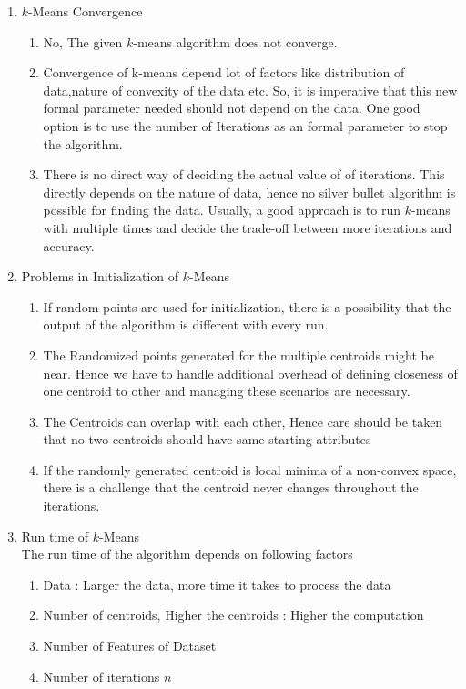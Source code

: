 \documentclass{article}
\begin{document}
\begin{enumerate}
\item $k$-Means Convergence
\begin{enumerate}
\item No, The given $k$-means algorithm does not converge.
\item Convergence of k-means depend lot of factors like distribution of data,nature of convexity of the data etc. So, it is imperative that this new formal parameter needed should not depend on the data. One good option is to use the number of Iterations as an formal parameter to stop the algorithm.
\item There is no direct way of deciding the actual value of  of iterations. This directly depends on the nature of data, hence no silver bullet algorithm is possible for finding the data. Usually, a good approach is to run $k$-means with multiple times and decide the trade-off between more iterations and accuracy.
\end{enumerate}
\item Problems in Initialization of $k$-Means
\begin{enumerate}
\item If random points are used for initialization, there is a possibility that the output of the algorithm is different with every run.
\item The Randomized points generated for the multiple centroids might be near. Hence we have to handle additional overhead of defining closeness of one centroid to other and managing these scenarios are necessary.
\item The Centroids can overlap with each other, Hence care should be taken that no two centroids should have same starting attributes
\item If the randomly generated centroid is local minima of a non-convex space, there is a challenge that the centroid never changes throughout the iterations.
\end{enumerate}
\item Run time of $k$-Means \\ The run time of the algorithm depends on following factors
\begin{enumerate}
\item Data : Larger the data, more time it takes to process the data
\item Number of centroids, Higher the centroids : Higher the computation
\item Number of Features of Dataset
\item Number of iterations $n$

\end{enumerate}
\end{enumerate}
\end{document}
